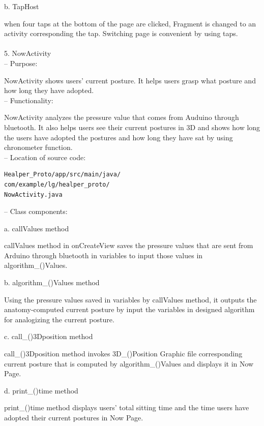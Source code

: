 \documentclass[conference]{IEEEtran}
\begin{document}
b. TapHost

when four taps at the bottom of the page are clicked, Fragment is changed to an activity corresponding the tap. Switching page is convenient by using taps. \\\\

5.	NowActivity\\

 --	Purpose:

NowActivity shows users' current posture. It helps users grasp what posture and how long they have adopted.  \\

 --	Functionality:

NowActivity analyzes the pressure value that comes from Auduino through bluetooth. It also helps users see their current postures in 3D and shows how long the users have adopted the postures and how long they have sat by using chronometer function.\\

 --	Location of source code:
 
\begin{verbatim}
Healper_Proto/app/src/main/java/
com/example/lg/healper_proto/
NowActivity.java
\end{verbatim}

 --	Class components:

a. callValues method 

callValues method in onCreateView saves the pressure values that are sent from Arduino through bluetooth in variables to input those values in algorithm\_()Values. 

b. algorithm\_()Values method 

Using the pressure values saved in variables by callValues method, it outputs the anatomy-computed current posture by input the variables in designed algorithm for analogizing the current posture. 

c. call\_()3Dposition method 

call\_()3Dposition method invokes 3D\_()Position Graphic file corresponding current posture that is computed by algorithm\_()Values and displays it in Now Page. 

d. print\_()time method 

print\_()time method displays users' total sitting time and the time users have adopted their current postures in Now Page. \\\\
\end{document}

